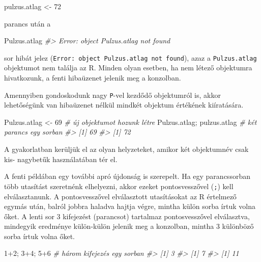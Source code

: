 \documentclass[
]{book}
\newenvironment{Shaded}{\begin{snugshade}}{\end{snugshade}}
\newcommand{\CommentTok}[1]{\textcolor[rgb]{0.56,0.35,0.01}{\textit{#1}}}
\newcommand{\DecValTok}[1]{\textcolor[rgb]{0.00,0.00,0.81}{#1}}
\newcommand{\NormalTok}[1]{#1}
\newcommand{\OtherTok}[1]{\textcolor[rgb]{0.56,0.35,0.01}{#1}}
\newcommand{\SpecialCharTok}[1]{\textcolor[rgb]{0.00,0.00,0.00}{#1}}
\begin{document}
\begin{Shaded}
\begin{Highlighting}[]
\NormalTok{pulzus.atlag }\OtherTok{\textless{}{-}} \DecValTok{72}
\end{Highlighting}
\end{Shaded}

parancs után a

\begin{Shaded}
\begin{Highlighting}[]
\NormalTok{Pulzus.atlag}
\CommentTok{\#\textgreater{} Error: object \textquotesingle{}Pulzus.atlag\textquotesingle{} not found}
\end{Highlighting}
\end{Shaded}

sor hibát jelez (\texttt{Error:\ object\ \textquotesingle{}Pulzus.atlag\textquotesingle{}\ not\ found}), azaz a \texttt{Pulzus.atlag} objektumot nem találja az R. Minden olyan esetben, ha nem létező objektumra hivatkozunk, a fenti hibaüzenet jelenik meg a konzolban.

Amennyiben gondoskodunk nagy \texttt{P}-vel kezdődő objektumról is, akkor lehetőségünk van hibaüzenet nélkül mindkét objektum értékének kiíratására.

\begin{Shaded}
\begin{Highlighting}[]
\NormalTok{Pulzus.atlag }\OtherTok{\textless{}{-}} \DecValTok{69}           \CommentTok{\# új objektumot hozunk létre}
\NormalTok{Pulzus.atlag; pulzus.atlag   }\CommentTok{\# két parancs egy sorban}
\CommentTok{\#\textgreater{} [1] 69}
\CommentTok{\#\textgreater{} [1] 72}
\end{Highlighting}
\end{Shaded}

A gyakorlatban kerüljük el az olyan helyzeteket, amikor két objektumnév csak kis- nagybetűk használatában tér el.

A fenti példában egy további apró újdonság is szerepelt. Ha egy parancssorban több utasítást szeretnénk elhelyezni, akkor ezeket pontosvesszővel (\texttt{;}) kell elválasztanunk. A pontosvesszővel elválasztott utasításokat az R értelmező egymás után, balról jobbra haladva hajtja végre, mintha külön sorba írtuk volna őket. A lenti sor 3 kifejezést (parancsot) tartalmaz pontosvesszővel elválasztva, mindegyik eredménye külön-külön jelenik meg a konzolban, mintha 3 különböző sorba írtuk volna őket.

\begin{Shaded}
\begin{Highlighting}[]
\DecValTok{1}\SpecialCharTok{+}\DecValTok{2}\NormalTok{; }\DecValTok{3}\SpecialCharTok{+}\DecValTok{4}\NormalTok{; }\DecValTok{5}\SpecialCharTok{+}\DecValTok{6}     \CommentTok{\# három kifejezés egy sorban}
\CommentTok{\#\textgreater{} [1] 3}
\CommentTok{\#\textgreater{} [1] 7}
\CommentTok{\#\textgreater{} [1] 11}
\end{Highlighting}
\end{Shaded}
\end{document}
